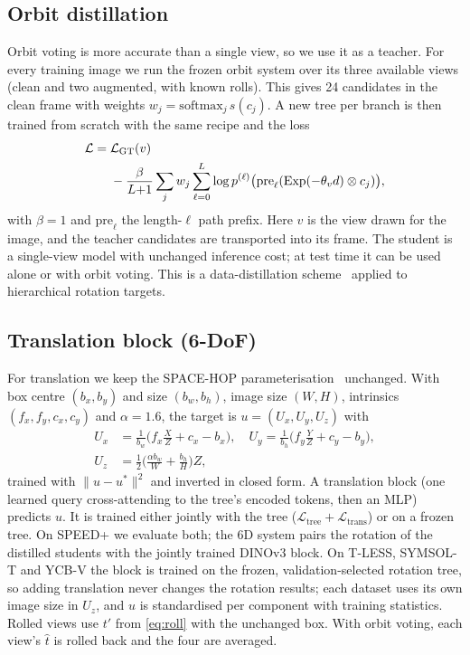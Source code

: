 \subsection{Orbit distillation}
\label{sec:distill}
Orbit voting is more accurate than a single view, so we use it as a teacher. For every training image we run the frozen orbit system over its three available views (clean and two augmented, with known rolls). This gives 24 candidates in the clean frame with weights $w_j=\mathrm{softmax}_j\, s(c_j)$. A new tree per branch is then trained from scratch with the same recipe and the loss
\begin{equation}
\begin{split}
  \mathcal{L}=\;&\mathcal{L}_{\text{GT}}(v)\\
  &-\frac{\beta}{L{+}1}\sum_j w_j\sum_{\ell=0}^{L}\log p^{(\ell)}\big(\mathrm{pre}_\ell(\mathrm{Exp}(-\theta_v d)\otimes c_j)\big),
\end{split}
  \label{eq:distill}
\end{equation}
with $\beta=1$ and $\mathrm{pre}_\ell$ the length-$\ell$ path prefix. Here $v$ is the view drawn for the image, and the teacher candidates are transported into its frame. The student is a single-view model with unchanged inference cost; at test time it can be used alone or with orbit voting. This is a data-distillation scheme~\cite{radosavovic2018data} applied to hierarchical rotation targets.

\subsection{Translation block (6-DoF)}
\label{sec:sixdof_method}
For translation we keep the SPACE-HOP parameterisation~\cite{dutta2026spacehop} unchanged. With box centre $(b_x,b_y)$ and size $(b_w,b_h)$, image size $(W,H)$, intrinsics $(f_x,f_y,c_x,c_y)$ and $\alpha=1.6$, the target is $u=(U_x,U_y,U_z)$ with
\begin{align}
U_x&=\tfrac{1}{b_w}\big(f_x\tfrac{X}{Z}+c_x-b_x\big),\quad U_y=\tfrac{1}{b_h}\big(f_y\tfrac{Y}{Z}+c_y-b_y\big),\\
U_z&=\tfrac{1}{2}\big(\tfrac{\alpha b_w}{W}+\tfrac{b_h}{H}\big)Z,
\end{align}
trained with $\|u-u^*\|^2$ and inverted in closed form. A translation block (one learned query cross-attending to the tree's encoded tokens, then an MLP) predicts $u$. It is trained either jointly with the tree ($\mathcal{L}_{\text{tree}}+\mathcal{L}_{\text{trans}}$) or on a frozen tree. On SPEED+ we evaluate both; the 6D system pairs the rotation of the distilled students with the jointly trained DINOv3 block. On T-LESS, SYMSOL-T and YCB-V the block is trained on the frozen, validation-selected rotation tree, so adding translation never changes the rotation results; each dataset uses its own image size in $U_z$, and $u$ is standardised per component with training statistics. Rolled views use $t'$ from \cref{eq:roll} with the unchanged box. With orbit voting, each view's $\hat t$ is rolled back and the four are averaged.
